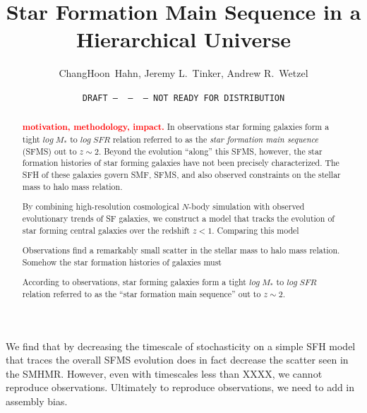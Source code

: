 \documentclass[12pt, letterpaper, preprint]{aastex}
\newcommand{\todo}[1]{{\bf \textcolor{red}{#1}}}
\begin{document}
\sloppy\sloppypar\frenchspacing

\title{Star Formation Main Sequence in a Hierarchical Universe} 
\date{\texttt{DRAFT~---~\githash~---~\gitdate~---~NOT READY FOR DISTRIBUTION}}
\author{ChangHoon~Hahn, 
Jeremy L.~Tinker, 
Andrew R.~Wetzel}

\begin{abstract}
    \todo{motivation, methodology, impact.}
    In observations star forming galaxies form a tight $log\;M_*$ to $log\;SFR$ 
    relation referred to as the {\em star formation main sequence} (SFMS) out to $z\sim2$. 
    Beyond the evolution ``along'' this SFMS, however, the star formation histories of star 
    forming galaxies have not been precisely characterized. 
    The SFH of these galaxies govern SMF, SFMS, and also observed constraints on the stellar mass to halo mass
    relation. 

    By combining high-resolution cosmological $N$-body simulation with observed evolutionary 
    trends of SF galaxies, we construct a model that tracks the evolution of star forming 
    central galaxies over the redshift $z < 1$. Comparing this model 

    Observations find a remarkably small scatter in the stellar mass to halo mass relation. 
    Somehow the star formation histories of galaxies must 
    
    According to observations, star forming galaxies form a tight $log\;M_*$ to $log\;SFR$ 
    relation referred to as the ``star formation main sequence'' out to $z\sim2$. 
\end{abstract}

We find that by decreasing the timescale of stochasticity on a simple SFH model that traces the overall 
SFMS evolution does in fact decrease the scatter seen in the SMHMR. However, even with timescales less
than XXXX, we cannot reproduce observations. Ultimately to reproduce observations, we need to add in 
assembly bias. 
\end{document}
